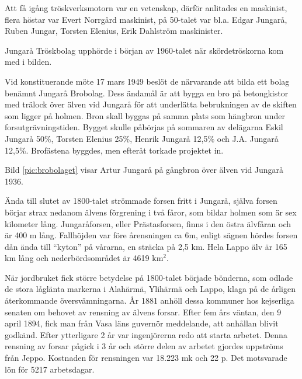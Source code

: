 Att få igång tröskverksmotorn var en vetenskap, därför anlitades en maskinist, flera höstar var Evert Norrgård maskinist, på 50-talet var bl.a. Edgar Jungarå, Ruben Jungar, Torsten Elenius, Erik Dahlström maskinister.

Jungarå Tröskbolag upphörde i början av 1960-talet när skördetröskorna kom med i bilden.





Vid konstituerande möte 17 mars 1949 beslöt de närvarande att bilda ett bolag benämnt Jungarå Brobolag. Dess ändamål är att bygga en bro på betongkistor med trälock över älven vid Jungarå för att underlätta 		 bebrukningen av de skiften som ligger på holmen. Bron skall byggas på samma plats som hängbron under  forsutgrävningstiden. Bygget skulle påbörjas på sommaren av delägarna Eskil Jungarå 50\%, Torsten Elenius 25\%, Henrik Jungarå 12,5\% och J.A. Jungarå 12,5\%. Brofästena byggdes, men efteråt torkade projektet in.

Bild \ref{pic:brobolaget} visar Artur Jungarå på gångbron över älven vid Jungarå 1936.\jhvspace[5]





Ända till slutet av 1800-talet strömmade forsen fritt i Jungarå, själva forsen börjar strax nedanom älvens förgrening i två fåror, som bildar holmen som är sex kilometer lång. Jungaråforsen, eller Prästasforsen, finns i den östra älvfåran och är 400 m lång. Fallhöjden var före årensningen ca 6m, enligt sägnen hördes forsen dån ända till ``kyton'' på vårarna, en  sträcka på 2,5 km. Hela Lappo älv är 165 km lång och nederbördsområdet är 4619 km$^2$.

När jordbruket fick större betydelse på 1800-talet började bönderna, som odlade de stora låglänta markerna i Alahärmä, Ylihärmä och Lappo, klaga på de årligen återkommande översvämningarna. År 1881 anhöll dessa kommuner hos kejserliga senaten om behovet av rensning av älvens forsar. Efter fem års väntan, den 9 april 1894, fick man från Vasa läns guvernör meddelande, att anhållan blivit godkänd. Efter ytterligare 2 år var ingenjörerna redo att starta arbetet. Denna rensning av forsar pågick i 3 år och större delen av arbetet gjordes uppströms från Jeppo. Kostnaden för rensningen var 18.223 mk och 22 p. Det motsvarade lön för 5217 arbetsdagar.

